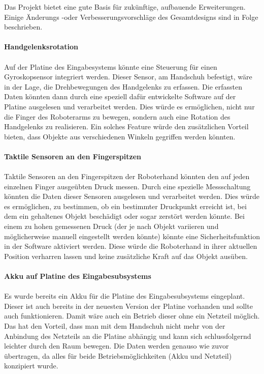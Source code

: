 \documentclass[titlepage,12pt,twoside]{article}
\begin{document}
Das Projekt bietet eine gute Basis für zukünftige, aufbauende Erweiterungen. Einige Änderungs -oder Verbesserungsvorschläge des Gesamtdesigns sind in Folge beschrieben. \\
\\
\textbf{Handgelenksrotation} \\
\\
Auf der Platine des Eingabesystems könnte eine Steuerung für einen Gyroskopsensor integriert werden. 
Dieser Sensor, am Handschuh befestigt, wäre in der Lage, die Drehbewegungen des Handgelenks zu 
erfassen. Die erfassten Daten könnten dann durch eine speziell dafür entwickelte Software auf der 
Platine ausgelesen und verarbeitet werden. Dies würde es ermöglichen, nicht nur die Finger des 
Roboterarms zu bewegen, sondern auch eine Rotation des Handgelenks zu realisieren. Ein solches 
Feature würde den zusätzlichen Vorteil bieten, dass Objekte aus verschiedenen Winkeln gegriffen 
werden könnten. \\
\\
\textbf{Taktile Sensoren an den Fingerspitzen} \\
\\
Taktile Sensoren an den Fingerspitzen der Roboterhand könnten den auf jeden einzelnen Finger 
ausgeübten Druck messen. Durch eine spezielle Messschaltung könnten die Daten dieser Sensoren 
ausgelesen und verarbeitet werden. Dies würde es ermöglichen, zu bestimmen, ob ein bestimmter 
Druckpunkt erreicht ist, bei dem ein gehaltenes Objekt beschädigt oder sogar zerstört werden könnte. 
Bei einem zu hohen gemessenen Druck (der je nach Objekt variieren und möglicherweise manuell 
eingestellt werden könnte) könnte eine Sicherheitsfunktion in der Software aktiviert werden. Diese 
würde die Roboterhand in ihrer aktuellen Position verharren lassen und keine zusätzliche Kraft auf 
das Objekt ausüben. \\
\\
\textbf{Akku auf Platine des Eingabesubsystems} \\
\\
Es wurde bereits ein Akku für die Platine des Eingabesubsystems eingeplant. Dieser ist auch bereits 
in der neuesten Version der Platine vorhanden und sollte auch funktionieren. Damit wäre auch ein 
Betrieb dieser ohne ein Netzteil möglich. Das hat den Vorteil, dass man mit dem Handschuh nicht 
mehr von der Anbindung des Netzteils an die Platine abhängig und kann sich schlussfolgernd leichter 
durch den Raum bewegen. Die Daten werden genauso wie zuvor übertragen, da alles für beide 
Betriebsmöglichkeiten (Akku und Netzteil) konzipiert wurde. \\
\end{document}
